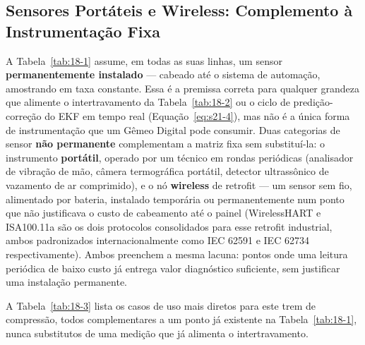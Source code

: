 \documentclass[12pt,a4paper]{article}
\numberwithin{equation}{section}
\numberwithin{table}{section}
\numberwithin{figure}{section}
\begin{document}
{\subsection{Sensores Portáteis e Wireless: Complemento à Instrumentação Fixa}

A Tabela~\ref{tab:18-1} assume, em todas as suas linhas, um sensor \textbf{permanentemente instalado} — cabeado até o sistema de automação, amostrando em taxa constante. Essa é a premissa correta para qualquer grandeza que alimente o intertravamento da Tabela~\ref{tab:18-2} ou o ciclo de predição-correção do EKF em tempo real (Equação~\eqref{eq:s21-4}), mas não é a única forma de instrumentação que um Gêmeo Digital pode consumir. Duas categorias de sensor \textbf{não permanente} complementam a matriz fixa sem substituí-la: o instrumento \textbf{portátil}, operado por um técnico em rondas periódicas (analisador de vibração de mão, câmera termográfica portátil, detector ultrassônico de vazamento de ar comprimido), e o nó \textbf{wireless} de retrofit — um sensor sem fio, alimentado por bateria, instalado temporária ou permanentemente num ponto que não justificava o custo de cabeamento até o painel (WirelessHART e ISA100.11a são os dois protocolos consolidados para esse retrofit industrial, ambos padronizados internacionalmente como IEC 62591 e IEC 62734 respectivamente). Ambos preenchem a mesma lacuna: pontos onde uma leitura periódica de baixo custo já entrega valor diagnóstico suficiente, sem justificar uma instalação permanente.

A Tabela~\ref{tab:18-3} lista os casos de uso mais diretos para este trem de compressão, todos complementares a um ponto já existente na Tabela~\ref{tab:18-1}, nunca substitutos de uma medição que já alimenta o intertravamento.

}
\end{document}
